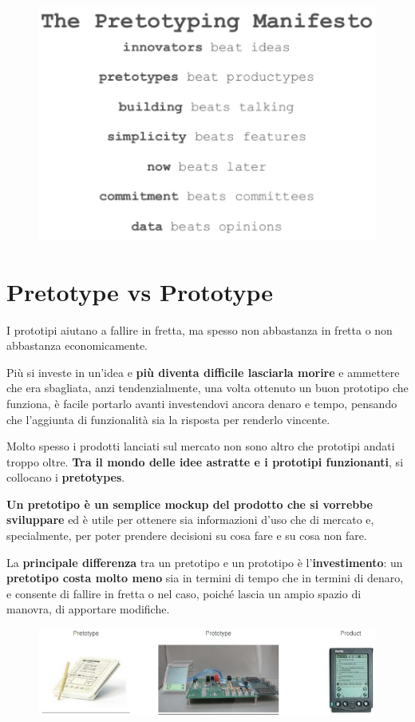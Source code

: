 \begin{figure}[!h]
	\centering
	\includegraphics[scale=0.6]{immagini/Manifesto.png}
\end{figure}

\section{Pretotype vs Prototype}
I prototipi aiutano a fallire in fretta, ma spesso non abbastanza in fretta o non abbastanza economicamente.

Più si investe in un'idea e \textbf{più diventa difficile lasciarla morire} e ammettere che era sbagliata, anzi tendenzialmente, una volta ottenuto un buon prototipo che funziona, è facile portarlo avanti investendovi ancora denaro e tempo, pensando che l'aggiunta di funzionalità sia la risposta per renderlo vincente.

Molto spesso i prodotti lanciati sul mercato non sono altro che prototipi andati troppo oltre. \textbf{Tra il mondo delle idee astratte e i prototipi funzionanti}, si collocano i \textbf{pretotypes}.

\textbf{Un pretotipo è un semplice mockup del prodotto che si vorrebbe sviluppare} ed è utile per ottenere sia informazioni d'uso che di mercato e, specialmente, per poter prendere decisioni su cosa fare e su cosa non fare.

La \textbf{principale differenza} tra un pretotipo e un prototipo è l'\textbf{investimento}: un \textbf{pretotipo costa molto meno} sia in termini di tempo che in termini di denaro, e consente di fallire in fretta o nel caso, poiché lascia un ampio spazio di manovra, di apportare modifiche.

\pagebreak

\begin{figure}[!h]
	\centering
	\includegraphics[scale=0.65]{immagini/Pre_prot.png}
\end{figure}

